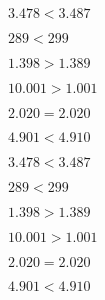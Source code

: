 \begin{multicols}{2}
\begin{rlist}
\item $ 3.478<3.487 $
\item $ 289<299 $
\item $ 1.398>1.389 $
\item $ 10.001>1.001 $
\item $ 2.020=2.020 $
\item $ 4.901<4.910 $
\end{rlist}
\end{multicols}
\begin{multicols}{2}
\begin{rlist}
\item $ 3.478<3.487 $
\item $ 289<299 $
\item $ 1.398>1.389 $
\item $ 10.001>1.001 $
\item $ 2.020=2.020 $
\item $ 4.901<4.910 $
\end{rlist}
\end{multicols}
